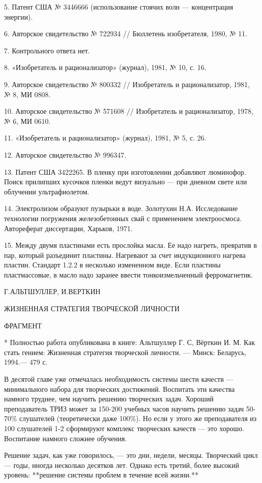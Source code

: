 5. Патент США № 3446666 (использование стоячих волн — концентрация энергии).

6. Авторское свидетельство № 722934 // Бюллетень изобретателя, 1980, № 11.

7. Контрольного ответа нет.

8. «Изобретатель и рационализатор» (журнал), 1981, № 10,
с. 16.

9. Авторское свидетельство № 800332 // Изобретатель и рационализатор, 1981, № 8, МИ 0808.


10. Авторское свидетельство № 571608 // Изобретатель и рационализатор, 1978, № 6, МИ 0610.

11. «Изобретатель и рационализатор» (журнал), 1981, № 5,
с. 26.

12. Авторское свидетельство № 996347.

13. Патент США 3422265. В пленку при изготовлении добавляют люминофор.
Поиск прилипших  кусочков пленки ведут  визуально — при  дневном свете
или облучении ультрафиолетом.

14. Электролизом образуют пузырьки в воде. Золотухин Н.А. Исследование
технологии погружения железобетонных свай с применением электроосмоса.
Автореферат диссертации, Харьков, 1971.

15.  Между двумя  пластинами есть  прослойка масла.  Ее надо  нагреть,
превратив  в  пар,  который  разъединит пластины.  Нагревают  за  счет
индукционного нагрева  пластин. Стандарт 1.2.2 в  несколько измененном
виде.  Если  пластины  пластмассовые,  в  масло  надо  заранее  ввести
тонкоизмельченный ферромагнетик.


Г.АЛЬТШУЛЛЕР, И.ВЕРТКИН

ЖИЗНЕННАЯ СТРАТЕГИЯ ТВОРЧЕСКОЙ ЛИЧНОСТИ

ФРАГМЕНТ

* Полностью работа  опубликована в книге: Альтшуллер Г.  С, Вёрткин И.
М. Как стать гением: Жизненная стратегия творческой личности. — Минск:
Беларусь, 1994.— 479 с.

В десятой главе  уже отмечалась необходимость системы  шести качеств —
минимального набора для творческих  достижений. Воспитать эти качества
намного  труднее,  чем  научить   решению  творческих  задач.  Хороший
преподаватель  ТРИЗ может  за  150-200 учебных  часов научить  решению
задач 50-70\% слушателей  (теоретически даже 100\%). Но если  у этого же
преподавателя  из 100  слушателей 1-2  сформируют комплекс  творческих
качеств — это хорошо. Воспитание намного сложнее обучения.

Решение  задач,  как  уже  говорилось,  —  это  дни,  недели,  месяцы.
Творческий цикл  — годы,  иногда несколько  десятков лет.  Однако есть
третий,  более высокий  уровень: **решение  системы проблем  в течение
всей жизни.**

